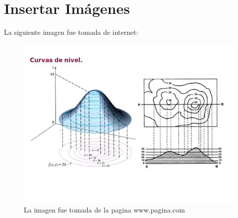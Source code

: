 \documentclass[12pt,letterpaper]{article}
\newcommand{\sangria}{\hspace*{0.5cm}}
\begin{document}
\section{Insertar Imágenes}
\sangria La siguiente imagen fue tomada de internet:\\
\begin{figure}[H]
\begin{center}
\includegraphics[scale=0.4]{Imagen1}
\caption{La imagen fue tomada de la pagina www.pagina.com}
\end{center}
\end{figure}
\end{document}
